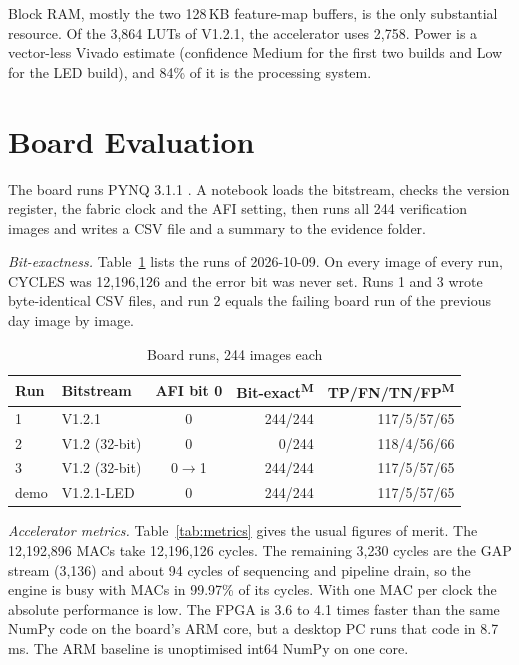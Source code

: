\documentclass[conference]{IEEEtran}
\newcommand{\meas}{\textsuperscript{M}}   %
\begin{document}
Block RAM, mostly the two 128\,KB feature-map buffers, is the only substantial resource. Of the
3,864 LUTs of V1.2.1, the accelerator uses 2,758. Power is a vector-less Vivado estimate
(confidence Medium for the first two builds and Low for the LED build), and 84\% of it is the
processing system.

\section{Board Evaluation}\label{sec:eval}

The board runs PYNQ 3.1.1 \cite{pynq}. A notebook loads the bitstream, checks the version
register, the fabric clock and the AFI setting, then runs all 244 verification images and writes
a CSV file and a summary to the evidence folder.

\textit{Bit-exactness.} Table~\ref{tab:runs} lists the runs of 2026-10-09. On every image of every
run, CYCLES was 12,196,126 and the error bit was never set. Runs 1 and 3 wrote byte-identical CSV
files, and run 2 equals the failing board run of the previous day image by image.

\begin{table}[t]
\caption{Board runs, 244 images each}
\label{tab:runs}
\centering\footnotesize
\setlength{\tabcolsep}{3pt}
\begin{tabular}{@{}llcrr@{}}
\toprule
Run & Bitstream & AFI bit 0 & Bit-exact\meas & TP/FN/TN/FP\meas \\
\midrule
1 & V1.2.1 & 0 & 244/244 & 117/5/57/65 \\
2 & V1.2 (32-bit) & 0 & 0/244 & 118/4/56/66 \\
3 & V1.2 (32-bit) & 0$\to$1 & 244/244 & 117/5/57/65 \\
demo & V1.2.1-LED & 0 & 244/244 & 117/5/57/65 \\
\bottomrule
\end{tabular}
\end{table}

\textit{Accelerator metrics.} Table~\ref{tab:metrics} gives the usual figures of merit. The
12,192,896 MACs take 12,196,126 cycles. The remaining 3,230 cycles are the GAP stream (3,136) and
about 94 cycles of sequencing and pipeline drain, so the engine is busy with MACs in 99.97\% of
its cycles. With one MAC per clock the absolute performance is low. The FPGA is 3.6 to 4.1 times
faster than the same NumPy code on the board's ARM core, but a desktop PC runs that code in
8.7\,ms. The ARM baseline is unoptimised int64 NumPy on one core.
\end{document}
